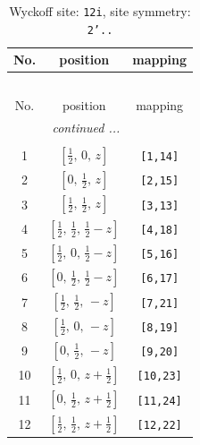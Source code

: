\documentclass[fleqn,8pt]{jsarticle}
\begin{document}
\begin{longtable}{ccc}
\caption{Wyckoff site: {\tt 12i}, site symmetry: {\tt 2'..}}
 \\
 \hline \hline
No. & position & mapping \\ \hline \endfirsthead

\multicolumn{2}{l}{\tablename\ \thetable{}} \\
 \hline \hline
No. & position & mapping \\ \hline \endhead

 \hline \hline
\multicolumn{2}{r}{\footnotesize\it continued ...} \\ \endfoot

 \hline \hline
\multicolumn{2}{r}{} \\ \endlastfoot

1 & $\left[ \frac{1}{2},\, 0,\, z \right]$ & {\tt [1,14]} \\ \hline
2 & $\left[ 0,\, \frac{1}{2},\, z \right]$ & {\tt [2,15]} \\ \hline
3 & $\left[ \frac{1}{2},\, \frac{1}{2},\, z \right]$ & {\tt [3,13]} \\ \hline
4 & $\left[ \frac{1}{2},\, \frac{1}{2},\, \frac{1}{2} - z \right]$ & {\tt [4,18]} \\ \hline
5 & $\left[ \frac{1}{2},\, 0,\, \frac{1}{2} - z \right]$ & {\tt [5,16]} \\ \hline
6 & $\left[ 0,\, \frac{1}{2},\, \frac{1}{2} - z \right]$ & {\tt [6,17]} \\ \hline
7 & $\left[ \frac{1}{2},\, \frac{1}{2},\, - z \right]$ & {\tt [7,21]} \\ \hline
8 & $\left[ \frac{1}{2},\, 0,\, - z \right]$ & {\tt [8,19]} \\ \hline
9 & $\left[ 0,\, \frac{1}{2},\, - z \right]$ & {\tt [9,20]} \\ \hline
10 & $\left[ \frac{1}{2},\, 0,\, z + \frac{1}{2} \right]$ & {\tt [10,23]} \\ \hline
11 & $\left[ 0,\, \frac{1}{2},\, z + \frac{1}{2} \right]$ & {\tt [11,24]} \\ \hline
12 & $\left[ \frac{1}{2},\, \frac{1}{2},\, z + \frac{1}{2} \right]$ & {\tt [12,22]} \\
\end{longtable}
\renewcommand{\arraystretch}{1.2}
\end{document}
